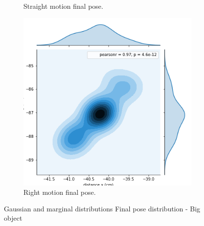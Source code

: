 \begin{figure}[ht!]
\begin{subfigure}[b]{0.3\textwidth}
		\caption{Straight motion final pose.}
		\label{distribution-right-turn}
	\end{subfigure}
	\qquad
	\begin{subfigure}[b]{0.3\textwidth}
		\includegraphics[width=\textwidth]{images/big_right.png}
		\caption{Right motion final pose.}
		\label{distribution-straight-motion}
	\end{subfigure}
	\caption{Gaussian and marginal distributions Final pose distribution - Big object}
\end{figure}

